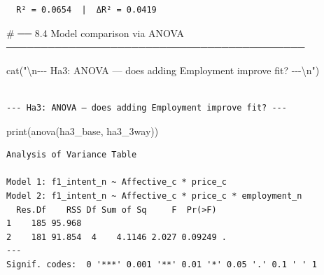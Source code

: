 \documentclass[
  letterpaper,
  DIV=11,
  numbers=noendperiod]{scrartcl}
\newenvironment{Shaded}{\begin{snugshade}}{\end{snugshade}}
\newcommand{\CommentTok}[1]{\textcolor[rgb]{0.37,0.37,0.37}{#1}}
\newcommand{\FunctionTok}[1]{\textcolor[rgb]{0.28,0.35,0.67}{#1}}
\newcommand{\NormalTok}[1]{\textcolor[rgb]{0.00,0.23,0.31}{#1}}
\newcommand{\SpecialCharTok}[1]{\textcolor[rgb]{0.37,0.37,0.37}{#1}}
\newcommand{\StringTok}[1]{\textcolor[rgb]{0.13,0.47,0.30}{#1}}
\begin{document}
\begin{Shaded}
\end{Shaded}

\begin{verbatim}
  R² = 0.0654  |  ΔR² = 0.0419
\end{verbatim}

\begin{Shaded}
\begin{Highlighting}[]
\CommentTok{\# ── 8.4  Model comparison via ANOVA ───────────────────────────────────────────}

\FunctionTok{cat}\NormalTok{(}\StringTok{"}\SpecialCharTok{\textbackslash{}n}\StringTok{{-}{-}{-} Ha3: ANOVA — does adding Employment improve fit? {-}{-}{-}}\SpecialCharTok{\textbackslash{}n}\StringTok{"}\NormalTok{)}
\end{Highlighting}
\end{Shaded}

\begin{verbatim}

--- Ha3: ANOVA — does adding Employment improve fit? ---
\end{verbatim}

\begin{Shaded}
\begin{Highlighting}[]
\FunctionTok{print}\NormalTok{(}\FunctionTok{anova}\NormalTok{(ha3\_base, ha3\_3way))}
\end{Highlighting}
\end{Shaded}

\begin{verbatim}
Analysis of Variance Table

Model 1: f1_intent_n ~ Affective_c * price_c
Model 2: f1_intent_n ~ Affective_c * price_c * employment_n
  Res.Df    RSS Df Sum of Sq     F  Pr(>F)  
1    185 95.968                             
2    181 91.854  4    4.1146 2.027 0.09249 .
---
Signif. codes:  0 '***' 0.001 '**' 0.01 '*' 0.05 '.' 0.1 ' ' 1
\end{verbatim}
\end{document}
